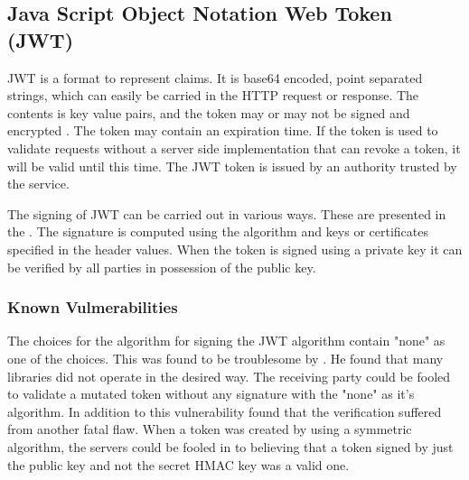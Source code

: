 \subsection{Java Script Object Notation Web Token (JWT)}
\begin{sloppypar}
    JWT is a format to represent claims. It is base64 encoded, point separated 
    strings, which can easily be carried in the HTTP request or response. The 
    contents is key value pairs, and the token may or may not be signed and 
    encrypted \citep{RFC7519}. The token may contain an expiration time. If the 
    token is used to validate requests without a server side implementation 
    that can revoke a token, it will be valid until this time. The JWT token is 
    issued by an authority trusted by the service.
\end{sloppypar}
\begin{sloppypar}
    The signing of JWT can be carried out in various ways. These are presented 
    in the \citet{RFC7515}. The signature is computed using the algorithm and 
    keys or certificates specified in the header values. When the token is 
    signed using a private key it can be verified by all parties in 
    possession of the public key. 
\end{sloppypar}


\subsubsection{Known Vulmerabilities}
\begin{sloppypar}
    The choices for the algorithm for signing the JWT algorithm contain 
    "none" as one of the choices. This was found to be troublesome by 
    \citet{nonejwt}. He found that many libraries did not operate in the 
    desired way. The receiving party could be fooled to validate a mutated 
    token without any signature with the "none" as it's algorithm. In 
    addition to this vulnerability \citet{nonejwt} found that the verification 
    suffered from another fatal flaw. When a token was created by using a 
    symmetric algorithm, the servers could be fooled in to believing that a 
    token signed by just the public key and not the secret HMAC key was a valid 
    one.
\end{sloppypar}


